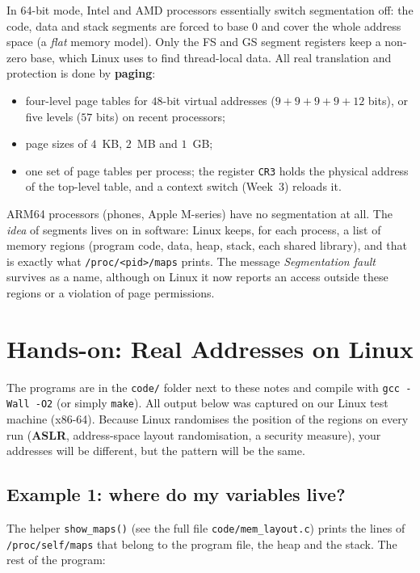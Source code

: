\documentclass[11pt,a4paper]{article}
\newcommand{\term}[1]{\textbf{\color{mintdeep}#1}}
\newcommand{\cmd}[1]{\texttt{#1}}
\begin{document}
In 64-bit mode, Intel and AMD processors essentially switch segmentation off: the code, data and stack segments are forced to base $0$ and cover the whole address space (a \emph{flat} memory model). Only the FS and GS segment registers keep a non-zero base, which Linux uses to find thread-local data. All real translation and protection is done by \textbf{paging}:
\begin{itemize}
  \item four-level page tables for $48$-bit virtual addresses ($9+9+9+9+12$ bits), or five levels ($57$ bits) on recent processors;
  \item page sizes of $4$~KB, $2$~MB and $1$~GB;
  \item one set of page tables per process; the register \texttt{CR3} holds the physical address of the top-level table, and a context switch (Week~3) reloads it.
\end{itemize}
ARM64 processors (phones, Apple M-series) have no segmentation at all. The \emph{idea} of segments lives on in software: Linux keeps, for each process, a list of memory regions (program code, data, heap, stack, each shared library), and that is exactly what \texttt{/proc/<pid>/maps} prints. The message \emph{Segmentation fault} survives as a name, although on Linux it now reports an access outside these regions or a violation of page permissions.

\section{Hands-on: Real Addresses on Linux}
\label{sec:handson}

The programs are in the \texttt{code/} folder next to these notes and compile with \cmd{gcc -Wall -O2} (or simply \cmd{make}). All output below was captured on our Linux test machine (x86-64). Because Linux randomises the position of the regions on every run (\term{ASLR}, address-space layout randomisation, a security measure), your addresses will be different, but the pattern will be the same.

\subsection{Example 1: where do my variables live?}

The helper \cmd{show\_maps()} (see the full file \texttt{code/mem\_layout.c}) prints the lines of \texttt{/proc/self/maps} that belong to the program file, the heap and the stack. The rest of the program:
\end{document}
